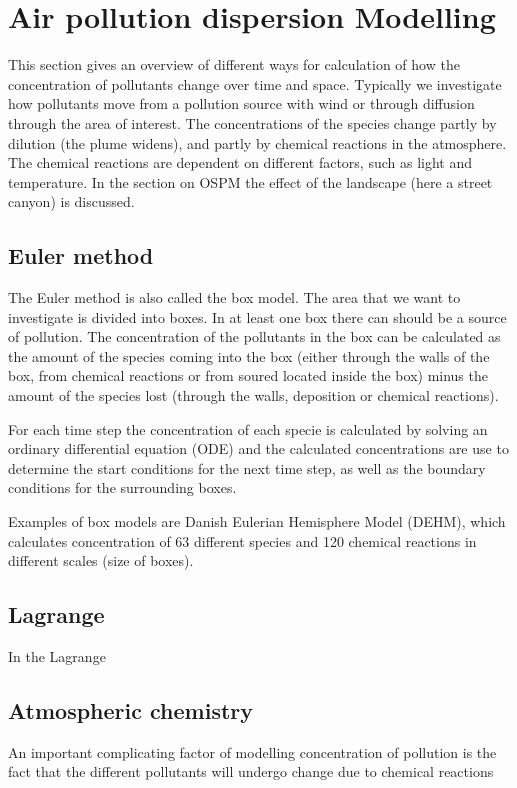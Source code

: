 \section{Air pollution dispersion Modelling}
This section gives an overview of different ways for calculation of how the concentration of pollutants change over time and space. Typically we investigate how pollutants move from a pollution source with wind or through diffusion through the area of interest. The concentrations of the species change partly by dilution (the plume widens), and partly by chemical reactions in the atmosphere. The chemical reactions are dependent on different factors, such as light and temperature. In the section on OSPM the effect of the landscape (here a street canyon) is discussed.

\subsection{Euler method}
The Euler method is also called the box model. The area that we want to investigate is divided into boxes. In at least one box there can should be a source of pollution. The concentration of the pollutants in the box can be calculated as the amount of the species coming into the box (either through the walls of the box, from chemical reactions or from soured located inside the box) minus the amount of the species lost (through the walls, deposition or chemical reactions).

For each time step the concentration of each specie is calculated by solving an ordinary differential equation (ODE) and the calculated concentrations are use to determine the start conditions for the next time step, as well as the boundary conditions for the surrounding boxes.

Examples of box models are Danish Eulerian Hemisphere Model (DEHM), which calculates concentration of 63 different species and 120 chemical reactions in different scales (size of boxes).

\subsection{Lagrange}
In the Lagrange 

\subsection{Atmospheric chemistry}
An important complicating factor of modelling concentration of pollution is the fact that the different pollutants will undergo change due to chemical reactions

